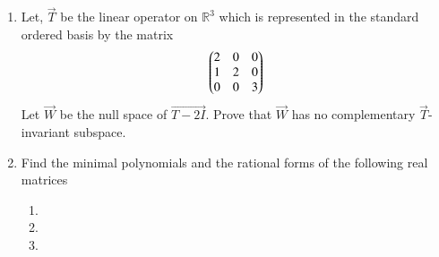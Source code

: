 \renewcommand{\theequation}{\theenumi}
\renewcommand{\thefigure}{\theenumi}
\begin{enumerate}[label=\thesubsection.\arabic*.,ref=\thesubsection.\theenumi]

\item Let, $\vec{T}$ be the linear operator on $\mathbb{R}^3$ which is represented in the standard ordered
basis by the matrix
\begin{align}
	\begin{pmatrix}2 & 0 & 0 \\ 1 & 2 & 0 \\ 0 & 0 & 3\end{pmatrix}
\end{align}
Let $\vec{W}$ be the null space of $\vec{T-2I}$. Prove that $\vec{W}$ has no complementary $\vec{T}$-invariant
subspace.
%
\\
\solution

\item  Find the minimal polynomials and the rational forms of  the following real matrices\\
 \begin{enumerate}
     \item {}
     \item {}
     \item \myvec{\cos\theta&\sin\theta\\-\sin\theta&\cos\theta}
 \end{enumerate}
%
\solution

\end{enumerate}
